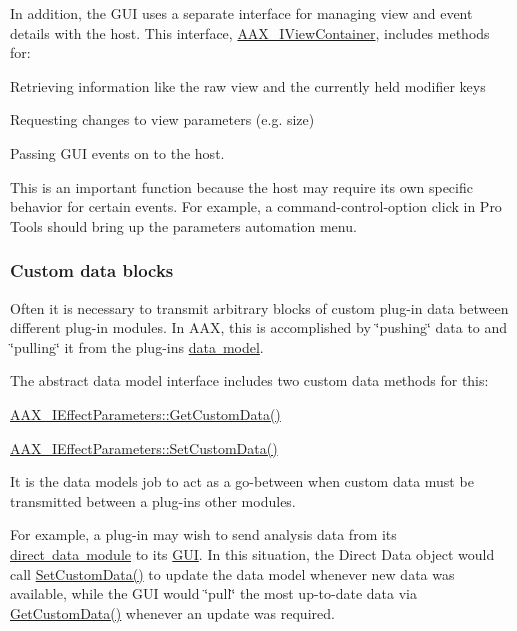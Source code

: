 In addition, the G\+UI uses a separate interface for managing view and event details with the host. This interface, \mbox{\hyperlink{a01889}{A\+A\+X\+\_\+\+I\+View\+Container}}, includes methods for\+:
\begin{DoxyItemize}
\item Retrieving information like the raw view and the currently held modifier keys
\item Requesting changes to view parameters (e.\+g. size)
\item Passing G\+UI events on to the host.
\begin{DoxyItemize}
\item This is an important function because the host may require its own specific behavior for certain events. For example, a command-\/control-\/option click in Pro Tools should bring up the parameter\textquotesingle{}s automation menu.
\end{DoxyItemize}
\end{DoxyItemize}\hypertarget{a00800_CommonInterface_Communication_hostmodules_customdata}{}\subsubsection{Custom data blocks}\label{a00800_CommonInterface_Communication_hostmodules_customdata}
Often it is necessary to transmit arbitrary blocks of custom plug-\/in data between different plug-\/in modules. In A\+AX, this is accomplished by \char`\"{}pushing\char`\"{} data to and \char`\"{}pulling\char`\"{} it from the plug-\/in\textquotesingle{}s \mbox{\hyperlink{a00798}{data model}}.

The abstract data model interface includes two custom data methods for this\+: \begin{DoxyItemize}
\item \mbox{\hyperlink{a01669_a4728fcad006d921a07489144360f447e}{A\+A\+X\+\_\+\+I\+Effect\+Parameters\+::\+Get\+Custom\+Data()}} \item \mbox{\hyperlink{a01669_aa838cad04781853ef2e0b9df22a05170}{A\+A\+X\+\_\+\+I\+Effect\+Parameters\+::\+Set\+Custom\+Data()}}\end{DoxyItemize}
It is the data model\textquotesingle{}s job to act as a go-\/between when custom data must be transmitted between a plug-\/in\textquotesingle{}s other modules.

For example, a plug-\/in may wish to send analysis data from its \mbox{\hyperlink{a00803}{direct data module}} to its \mbox{\hyperlink{a00799}{G\+UI}}. In this situation, the Direct Data object would call \mbox{\hyperlink{a01669_aa838cad04781853ef2e0b9df22a05170}{Set\+Custom\+Data()}} to update the data model whenever new data was available, while the G\+UI would \char`\"{}pull\char`\"{} the most up-\/to-\/date data via \mbox{\hyperlink{a01669_a4728fcad006d921a07489144360f447e}{Get\+Custom\+Data()}} whenever an update was required.

